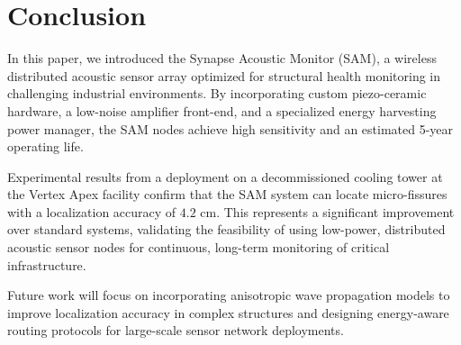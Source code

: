 \section{Conclusion}
\label{sec:conclusion}

In this paper, we introduced the Synapse Acoustic Monitor (SAM), a wireless distributed acoustic sensor array optimized for structural health monitoring in challenging industrial environments. By incorporating custom piezo-ceramic hardware, a low-noise amplifier front-end, and a specialized energy harvesting power manager, the SAM nodes achieve high sensitivity and an estimated 5-year operating life. 

Experimental results from a deployment on a decommissioned cooling tower at the Vertex Apex facility confirm that the SAM system can locate micro-fissures with a localization accuracy of $4.2$ cm. This represents a significant improvement over standard systems, validating the feasibility of using low-power, distributed acoustic sensor nodes for continuous, long-term monitoring of critical infrastructure. 

Future work will focus on incorporating anisotropic wave propagation models to improve localization accuracy in complex structures and designing energy-aware routing protocols for large-scale sensor network deployments.
